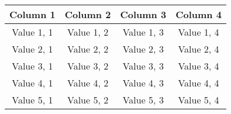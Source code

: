 
\begin{tabular}{||c c c c||}
	\hline
	Column 1 & Column 2 & Column 3 & Column 4 \\
	\hline\hline
	Value 1, 1 & Value 1, 2 & Value 1, 3 & Value 1, 4 \\
	\hline
	Value 2, 1 & Value 2, 2 & Value 2, 3 & Value 2, 4 \\
	\hline
	Value 3, 1 & Value 3, 2 & Value 3, 3 & Value 3, 4 \\
	\hline
	Value 4, 1 & Value 4, 2 & Value 4, 3 & Value 4, 4 \\
	\hline
	Value 5, 1 & Value 5, 2 & Value 5, 3 & Value 5, 4 \\
	\hline
\end{tabular}
